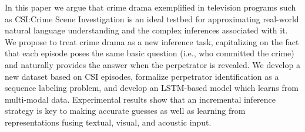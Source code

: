 In this paper we argue that crime drama exemplified in television programs such as CSI:Crime Scene Investigation is an ideal testbed for approximating real-world natural language understanding and the complex inferences associated with it. We propose to treat crime drama as a new inference task, capitalizing on the fact that each episode poses the same basic question (i.e., who committed the crime) and naturally provides the answer when the perpetrator is revealed. We develop a new dataset based on CSI episodes, formalize perpetrator identification as a sequence labeling problem, and develop an LSTM-based model which learns from multi-modal data. Experimental results show that an incremental inference strategy is key to making accurate guesses as well as learning from representations fusing textual, visual, and acoustic input.